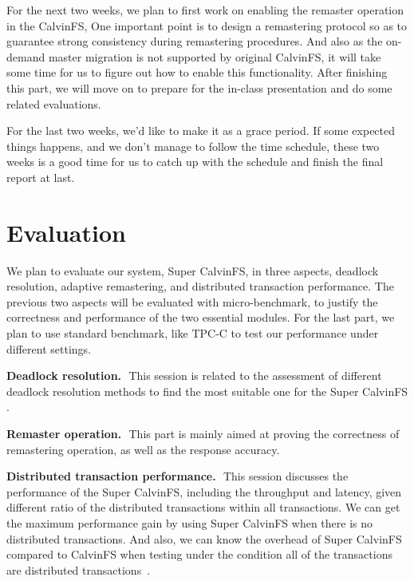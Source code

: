 \documentclass[letterpaper,twocolumn,10pt]{article}
\begin{document}
For the next two weeks, we plan to first work on enabling the remaster operation in the CalvinFS, One important point is to design a remastering protocol so as to guarantee strong consistency during remastering procedures. And also as the on-demand master migration is not supported by original CalvinFS, it will take some time for us to figure out how to enable this functionality. After finishing this part, we will move on to prepare for the in-class presentation and do some related evaluations.


For the last two weeks, we’d like to make it as a grace period. If some expected things happens, and we don’t manage to follow the time schedule, these two weeks is a good time for us to catch up with the schedule and finish the final report at last. 


\section{Evaluation}
We plan to evaluate our system, Super CalvinFS, in three aspects, deadlock resolution, adaptive remastering, and distributed transaction performance. The previous two aspects will be evaluated with micro-benchmark, to justify the correctness and performance of the two essential modules. For the last part, we plan to use standard benchmark, like TPC-C to test our performance under different settings. 

\indent \textbf{Deadlock resolution.} \,\,This session is related to the assessment of different deadlock resolution methods to find the most suitable one for the Super CalvinFS . 

\textbf{Remaster operation.} \,\,This part is mainly aimed at proving the correctness of remastering operation, as well as the response accuracy.

\textbf{Distributed transaction performance.} \,\,This session discusses the performance of the Super CalvinFS, including the throughput and latency, given different ratio of the distributed transactions within all transactions. We can get the maximum performance gain by using Super CalvinFS when there is no distributed transactions. And also, we can know the overhead of Super CalvinFS compared to CalvinFS when testing under the condition all of the transactions are distributed transactions~\cite{Einstein}.
\fi


{\footnotesize 
}


\end{document}
